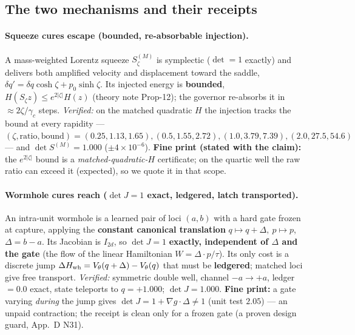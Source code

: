 \documentclass[11pt]{article}
\newcommand{\detJ}{\det J}
\begin{document}
\subsection{The two mechanisms and their receipts}
\paragraph{Squeeze cures escape (bounded, re-absorbable injection).} A mass-weighted Lorentz squeeze $S^{(M)}_\zeta$ is symplectic ($\det=1$ exactly) and delivers both amplified velocity and displacement toward the saddle, $\delta q'=\delta q\cosh\zeta+p_0\sinh\zeta$. Its injected energy is \textbf{bounded}, $H(S_\zeta z)\le e^{2|\zeta|}H(z)$ (theory note Prop-12); the governor re-absorbs it in $\approx2\zeta/\gamma_c$ steps. \emph{Verified:} on the matched quadratic $H$ the injection tracks the bound at every rapidity --- $(\zeta,\text{ratio},\text{bound})=(0.25,1.13,1.65),(0.5,1.55,2.72),(1.0,3.79,7.39),(2.0,27.5,54.6)$ --- and $\det S^{(M)}=1.000$ ($\pm4{\times}10^{-6}$). \textbf{Fine print (stated with the claim):} the $e^{2|\zeta|}$ bound is a \emph{matched-quadratic-$H$} certificate; on the quartic well the raw ratio can exceed it (expected), so we quote it in that scope.

\paragraph{Wormhole cures reach ($\detJ=1$ exact, ledgered, latch transported).} An intra-unit wormhole is a learned pair of loci $(a,b)$ with a hard gate frozen at capture, applying the \textbf{constant canonical translation} $q\mapsto q+\Delta,\ p\mapsto p$, $\Delta=b-a$. Its Jacobian is $I_{2d}$, so $\detJ=1$ \textbf{exactly, independent of $\Delta$ and the gate} (the flow of the linear Hamiltonian $W=\Delta\cdot p/\tau$). Its only cost is a discrete jump $\Delta H_{\rm wh}=V_\theta(q+\Delta)-V_\theta(q)$ that must be \textbf{ledgered}; matched loci give free transport. \emph{Verified:} symmetric double well, channel $-a{\to}+a$, ledger $=0.0$ exact, state teleports to $q=+1.000$; $\detJ=1.000$. \textbf{Fine print:} a gate varying \emph{during} the jump gives $\detJ=1+\nabla g\cdot\Delta\neq1$ (unit test $2.05$) --- an unpaid contraction; the receipt is clean only for a frozen gate (a proven design guard, App.~D N31).
\end{document}
